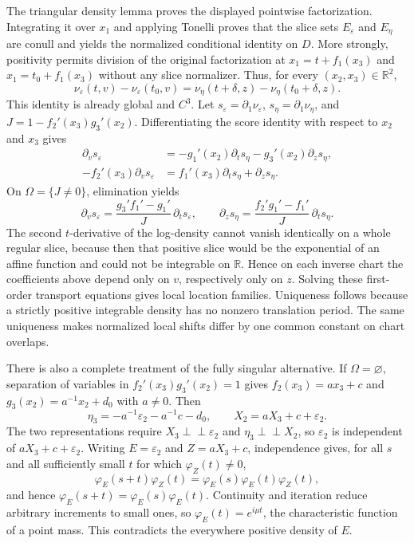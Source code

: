 The triangular density lemma proves the displayed pointwise factorization.  Integrating it over \(x_1\) and applying Tonelli proves that the slice sets \(E_{\varepsilon}\) and \(E_{\eta}\) are conull and yields the normalized conditional identity on \(D\).  More strongly, positivity permits division of the original factorization at \(x_1=t+f_1(x_3)\) and \(x_1=t_0+f_1(x_3)\) without any slice normalizer.  Thus, for every \((x_2,x_3)\in\mathbb R^2\),
\[
 \nu_{\varepsilon}(t,v)-\nu_{\varepsilon}(t_0,v)
 =\nu_{\eta}(t+\delta,z)-\nu_{\eta}(t_0+\delta,z).
\]
This identity is already global and \(C^3\).  Let \(s_{\varepsilon}=\partial_1\nu_{\varepsilon}\), \(s_{\eta}=\partial_1\nu_{\eta}\), and \(J=1-f_2'(x_3)g_3'(x_2)\).  Differentiating the score identity with respect to \(x_2\) and \(x_3\) gives
\[
 \begin{aligned}
 \partial_v s_{\varepsilon}
 &=-g_1'(x_2)\partial_t s_{\eta}-g_3'(x_2)\partial_zs_{\eta},\\
 -f_2'(x_3)\partial_v s_{\varepsilon}
 &=f_1'(x_3)\partial_t s_{\eta}+\partial_zs_{\eta}.
 \end{aligned}
\]
On \(\Omega=\{J\neq0\}\), elimination yields
\[
 \partial_v s_{\varepsilon}
 =\frac{g_3'f_1'-g_1'}{J}\,\partial_t s_{\varepsilon},
 \qquad
 \partial_zs_{\eta}
 =\frac{f_2'g_1'-f_1'}{J}\,\partial_t s_{\eta}.
\]
The second \(t\)-derivative of the log-density cannot vanish identically on a whole regular slice, because then that positive slice would be the exponential of an affine function and could not be integrable on \(\mathbb R\).  Hence on each inverse chart the coefficients above depend only on \(v\), respectively only on \(z\).  Solving these first-order transport equations gives local location families.  Uniqueness follows because a strictly positive integrable density has no nonzero translation period.  The same uniqueness makes normalized local shifts differ by one common constant on chart overlaps.

There is also a complete treatment of the fully singular alternative.  If \(\Omega=\varnothing\), separation of variables in \(f_2'(x_3)g_3'(x_2)=1\) gives \(f_2(x_3)=ax_3+c\) and \(g_3(x_2)=a^{-1}x_2+d_0\) with \(a\neq0\).  Then
\[
 \eta_3=-a^{-1}\varepsilon_2-a^{-1}c-d_0,
 \qquad
 X_2=aX_3+c+\varepsilon_2.
\]
The two representations require \(X_3\perp\!\!\!\perp\varepsilon_2\) and \(\eta_3\perp\!\!\!\perp X_2\), so \(\varepsilon_2\) is independent of \(aX_3+c+\varepsilon_2\).  Writing \(E=\varepsilon_2\) and \(Z=aX_3+c\), independence gives, for all \(s\) and all sufficiently small \(t\) for which \(\varphi_Z(t)\neq0\),
\[
 \varphi_E(s+t)\varphi_Z(t)
 =\varphi_E(s)\varphi_E(t)\varphi_Z(t),
\]
and hence \(\varphi_E(s+t)=\varphi_E(s)\varphi_E(t)\).  Continuity and iteration reduce arbitrary increments to small ones, so \(\varphi_E(t)=e^{i\mu t}\), the characteristic function of a point mass.  This contradicts the everywhere positive density of \(E\).

